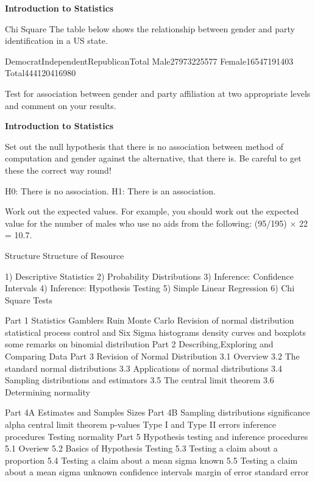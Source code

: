 

\textbf{Introduction to Statistics}


Chi Square
The table below shows the relationship between gender and party identification in a US state.


DemocratIndependentRepublicanTotal
Male27973225577
Female16547191403
Total444120416980

Test for association between gender and party affiliation at two appropriate levels
and comment on your results.


\textbf{Introduction to Statistics}

Set out the null hypothesis that there is no association between method of computation
and gender against the alternative, that there is. Be careful to get these the correct way
round!

H0: There is no association.
H1: There is an association.

Work out the expected values. For example, you should work out the expected value for
the number of males who use no aids from the following: (95/195) × 22 = 10.7.


\newpage
Structure
Structure of Resource

1) Descriptive Statistics
2) Probability Distributions
3) Inference: Confidence Intervals
4) Inference: Hypothesis Testing
5) Simple Linear Regression
6) Chi Square Tests

Part 1 Statistics 
Gamblers Ruin Monte Carlo 
Revision of normal distribution
statistical process control and Six Sigma
histograms density curves and boxplots
some remarks on binomial distribution
Part 2 Describing,Exploring and Comparing Data
Part 3 Revision of Normal Distribution
3.1 Overview
3.2 The standard normal distributions
3.3 Applications of normal distributions
3.4 Sampling distributions and estimators
3.5 The central limit theorem
3.6 Determining normality

Part 4A Estimates and Samples Sizes
Part 4B Sampling distributions
significance alpha
central limit theorem
p-values Type I and Type II errors
inference procedures
Testing normality
Part 5 Hypothesis testing and inference procedures
5.1 Overiew
5.2 Basics of Hypothesis Testing
5.3 Testing a claim about a proportion
5.4 Testing a claim about a mean sigma known
5.5 Testing a claim about a mean sigma unknown
confidence intervals margin of error standard error

